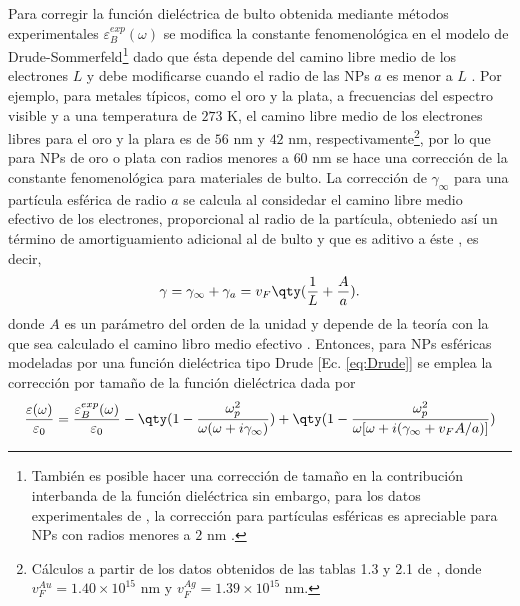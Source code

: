 Para corregir la función dieléctrica de bulto obtenida mediante métodos experimentales $\varepsilon_B^{exp}(\omega)$ se modifica la constante fenomenológica  en el modelo de Drude-Sommerfeld\footnote{También es posible hacer una corrección de tamaño en la contribución interbanda de la función dieléctrica sin embargo, para los datos experimentales de \cite{johnson1972constants}, la corrección para partículas esféricas es apreciable para NPs con radios menores a $2$ nm \cite{mendoza2014determination}.} dado que ésta depende del camino libre medio de los electrones $L$ y debe modificarse cuando el radio de las NPs $a$ es menor a $L$ \cite{kreibig1995clusters}. Por ejemplo, para metales típicos, como el oro y la plata, a frecuencias del espectro visible y a una temperatura de $273$ K, el camino libre medio de los electrones libres para el oro y la plara es  de $56$ nm  y $42$ nm, respectivamente\footnote{Cálculos a partir de los datos obtenidos de las tablas 1.3 y 2.1 de \cite{ashcroft1976solid}, donde $v_F^{Au} = 1.40\times 10^{15}$ nm y $v_F^{Ag}=1.39\times 10^{15}$ nm.}, por lo que para NPs de oro o plata con radios menores a $60$ nm se hace una corrección de la constante fenomenológica para materiales de bulto. La corrección de $\gamma_\infty$ para una partícula esférica de radio $a$ se calcula al considedar el camino libre medio efectivo de los electrones, proporcional al radio de la partícula, obteniedo así un término de amortiguamiento adicional al de bulto y que es aditivo a éste \cite{kreibig1995clusters}, es decir,
	\begin{align*}
	 \gamma = \gamma_\infty + \gamma_a = v_F \qty(\frac{1}{L}+\frac{A}{a}). 
	\end{align*}
donde $A$ es un parámetro del orden de la unidad \cite{noguez2007surface,mendoza2014determination} y depende de la teoría con la que sea calculado el camino libro medio efectivo \cite{kreibig1995clusters}.  Entonces, para NPs esféricas modeladas por una función dieléctrica tipo Drude [Ec.  \eqref{eq:Drude}] se emplea  la corrección por tamaño de la función dieléctrica dada por 
	\begin{align}
	\frac{\varepsilon(\omega)}{\varepsilon_0} = \frac{\varepsilon_B^{exp}(\omega)}{\varepsilon_0}
						 - \qty( 1 - \frac{\omega_p^2}{\omega(\omega+i\gamma_\infty)}) 
						 + \qty( 1 - \frac{\omega_p^2}{\omega[\omega+i(\gamma_\infty + v_F A/a)]})
			\label{eq:sizeCorrection}
	\end{align}
